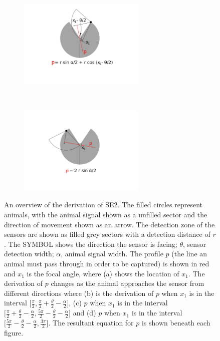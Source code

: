 \documentclass[a4paper,10pt,reqno,oneside]{amsart}
\begin{document}
\begin{figure}[t]
	\begin{subfigure}[t]{60mm}
                \centering
		\includegraphics[width=60mm, trim= 6cm 2cm 6cm 1cm]{imgs/secondIntegral.pdf}
                \caption{}
                \label{f:secondInt}
        \end{subfigure}%
	~ 
	\begin{subfigure}[t]{60mm}
                \centering
		\includegraphics[width=60mm, trim= 6cm 2cm 6cm 4cm]{imgs/thirdIntegral.pdf}
                \caption{}
                \label{f:thirdInt}
        \end{subfigure}%
\label{f:x1AndInt}
\caption{An overview of the derivation of SE2. The filled circles represent animals, with the animal signal shown as a unfilled sector and the direction of movement shown as an arrow. The detection zone of the sensors are shown as filled grey sectors with a detection distance of $r$. The SYMBOL shows the direction the sensor is facing;  $\theta$, sensor detection width; $\alpha$, animal signal width. The profile $p$ (the line an animal must pass through in order to be captured) is shown in red and $x_1$ is the focal angle, where (a) shows the location of $x_1$. The derivation of $p$ changes as the animal approaches the sensor from different directions where (b) is the derivation of $p$ when $x_1$ is in the interval $\lbrack\frac{\pi}{2}, \frac{\pi}{2} + \frac{\theta}{2} - \frac{\alpha}{2}\rbrack$, (c)  $p$ when $x_1$ is in the interval $\lbrack\frac{\pi}{2} + \frac{\theta}{2} - \frac{\alpha}{2}, \frac{5 \pi}{2} - \frac{\theta}{2} - \frac{\alpha}{2} \rbrack$ and (d) $p$ when $x_1$ is in the interval $\lbrack\frac{5 \pi}{2} - \frac{\theta}{2} - \frac{\alpha}{2}, \frac{3 \pi}{2}\rbrack$. The resultant equation for $p$ is shown beneath each figure.}
\end{figure}
\end{document}
